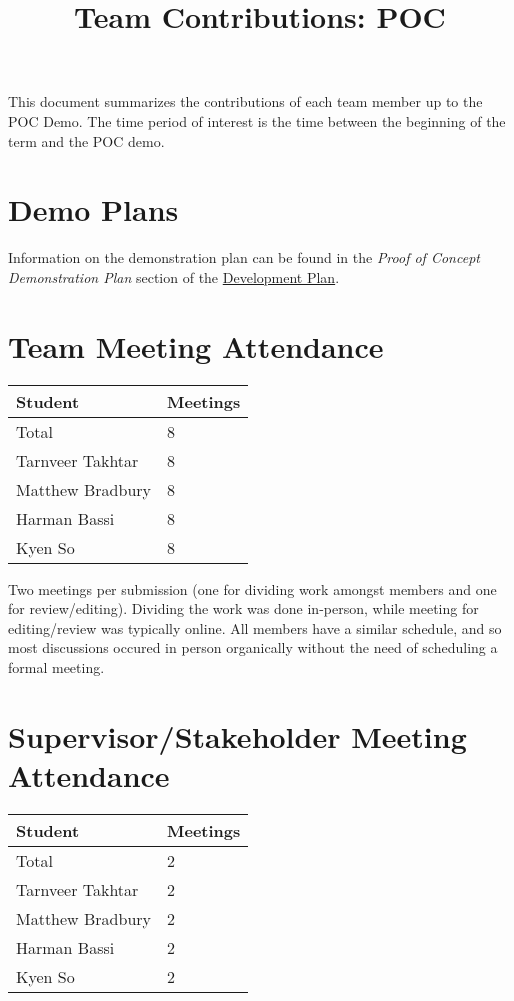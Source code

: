 \documentclass{article}
\title{Team Contributions: POC\\\progname}
\author{\authname}
\date{}
\begin{document}
\maketitle

This document summarizes the contributions of each team member up to the POC
Demo.  The time period of interest is the time between the beginning of the term
and the POC demo.

\section{Demo Plans}

Information on the demonstration plan can be found in the \textit{Proof of Concept Demonstration Plan} section of the \href{https://github.com/takhtart/PCD/blob/main/docs/DevelopmentPlan/DevelopmentPlan.pdf}{Development Plan}.

\section{Team Meeting Attendance}


\begin{table}[H]
\centering
\begin{tabular}{ll}
\toprule
\textbf{Student} & \textbf{Meetings}\\
\midrule
Total & 8\\
Tarnveer Takhtar & 8\\
Matthew Bradbury & 8\\
Harman Bassi & 8\\
Kyen So & 8\\
\bottomrule
\end{tabular}
\end{table}


Two meetings per submission (one for dividing work amongst members and one for review/editing). 
Dividing the work was done in-person, while meeting for editing/review was typically online. All members have a similar schedule, 
and so most discussions occured in person organically without the need of scheduling a formal meeting. 

\section{Supervisor/Stakeholder Meeting Attendance}


\begin{table}[H]
\centering
\begin{tabular}{ll}
\toprule
\textbf{Student} & \textbf{Meetings}\\
\midrule
Total & 2\\
Tarnveer Takhtar & 2\\
Matthew Bradbury & 2\\
Harman Bassi & 2\\
Kyen So & 2\\
\bottomrule
\end{tabular}
\end{table}
\end{document}

